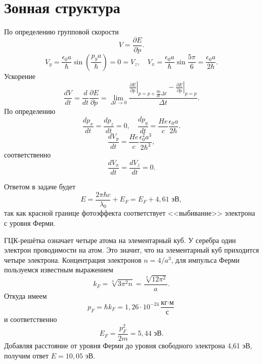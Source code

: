 \documentclass[a4paper]{article}
\begin{document}
\section{Зонная структура}
\begin{hiProb}[3.38]
\end{hiProb}
\begin{sol}
По определению групповой скорости
\[
V=\frac{\partial E}{\partial p} 
.\] 
\[
	V_y= \frac{\epsilon_0 a}{\hbar } \sin \left( \frac{p_y a}{\hbar } \right) =0=V_z,\quad
	V_x= \frac{\epsilon_0 a}{\hbar }\sin
	\frac{5\pi}{6}= \frac{\epsilon_0 a}{2\hbar }
.\] 
Ускорение
\[
\frac{dV}{dt}= \frac{d}{dt} \frac{\partial E}{\partial p} =
\lim_{\Delta t \to 0} \frac{\left. \frac{\partial E}{\partial p}  \right|_{p=p+ \frac{dp}{dt}\Delta t}-
	\left. \frac{\partial E}{\partial p}  \right|_{p=p}}{\Delta t}
.\] 
По определению
\[
\frac{dp_x}{dt}= \frac{dp_z}{dt}=0,\quad
\frac{dp_y}{dt}= \frac{He}{c} \frac{\epsilon_0 a}{
2\hbar }
.\] 
\[
\frac{dV_y}{dt}=\frac{He}{c} \frac{\epsilon_0^2 a^3}{2\hbar ^3}
,\]
соответственно
\[
\frac{dV_x}{dt}= \frac{dV_z}{dt}=0
.\] 
\end{sol}
\begin{hiProb}[3.85]
\end{hiProb}
\begin{sol}
Ответом в задаче будет
\[
E= \frac{2\pi \hbar  c}{\lambda_0}+E_F=E_F+4,61 \text{ эВ}
,\] 
так как красной границе фотоэффекта соответствует
<<выбивание>> электрона с уровня Ферми.

ГЦК-решётка означает четыре атома на элементарный
куб. У серебра один электрон проводимости на атом.
Это значит, что на элементарный куб приходится
четыре электрона. Концентрация электронов $n=4 /a^3$,
для импульса Ферми пользуемся известным выражением
\[
	k_F= \sqrt[3]{3\pi^2 n} = \frac{\sqrt[3]{12 \pi^2} }{a}
.\]
Откуда имеем
\[
p_F= \hbar  k_F=1,26 \cdot  10^{-24} \frac{\text{кг}\cdot \text{м}}{\text{с}}
\]
и соответственно
\[
E_F= \frac{p_F^2}{2m}=5,44 \text{ эВ}
.\] 
Добавляя расстояние от уровня Ферми до уровня свободного электрона 4,61 эВ, получим ответ $E=10,05$ эВ.
\end{sol}
\begin{hiProb}[3.57]
\end{hiProb}
\end{document}
